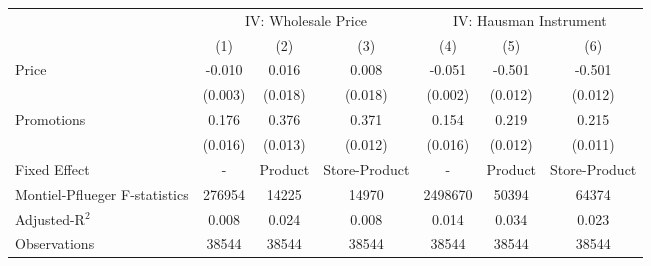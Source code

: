 \begin{tabular}{l*{6}{c}}
\hline\hline
                    &\multicolumn{3}{c}{IV: Wholesale Price}&\multicolumn{3}{c}{IV: Hausman Instrument}\\\cmidrule(lr){2-4}\cmidrule(lr){5-7}
                    &\multicolumn{1}{c}{(1)}&\multicolumn{1}{c}{(2)}&\multicolumn{1}{c}{(3)}&\multicolumn{1}{c}{(4)}&\multicolumn{1}{c}{(5)}&\multicolumn{1}{c}{(6)}\\
\hline
Price               &      -0.010&       0.016&       0.008&      -0.051&      -0.501&      -0.501\\
                    &     (0.003)&     (0.018)&     (0.018)&     (0.002)&     (0.012)&     (0.012)\\
[1em]
Promotions          &       0.176&       0.376&       0.371&       0.154&       0.219&       0.215\\
                    &     (0.016)&     (0.013)&     (0.012)&     (0.016)&     (0.012)&     (0.011)\\
\hline
Fixed Effect        &           -&     Product&Store-Product&           -&     Product&Store-Product\\
Montiel-Pflueger F-statistics&      276954&       14225&       14970&     2498670&       50394&       64374\\
Adjusted-R$^2$      &       0.008&       0.024&       0.008&       0.014&       0.034&       0.023\\
Observations        &       38544&       38544&       38544&       38544&       38544&       38544\\
\hline\hline
\end{tabular}
